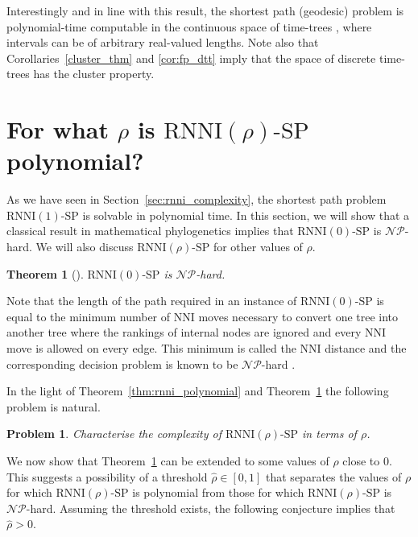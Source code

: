 \documentclass[11pt]{amsart}
\newtheorem{theorem}{Theorem}
\newtheorem{problem}{Problem}
\newcommand{\rnni}{\mathrm{RNNI}}
\newcommand{\nni}{\mathrm{NNI}}
\newcommand{\np}{\mathcal{NP}}
\newcommand{\p}{\mathcal{P}}
\newcommand{\decprob}[1]{\rnni(#1)\text{-}\mathrm{SP}}
\newcommand{\summary}[1]{} %
\begin{document}
Interestingly and in line with this result, the shortest path (geodesic) problem is polynomial-time computable in the continuous space of time-trees \autocite{Gavryushkin2016-uu}, where intervals can be of arbitrary real-valued lengths.
Note also that Corollaries~\ref{cluster_thm} and \ref{cor:fp_dtt} imply that the space of discrete time-trees has the cluster property.


\section{For what $\rho$ is $\decprob{\rho}$ polynomial?}

\summary{Summarising results on complexity of $\decprob{\rho}$ -- $\decprob{1} \in \p$ and $\decprob{0} \in \np$}
As we have seen in Section~\ref{sec:rnni_complexity}, the shortest path problem $\decprob{1}$ is solvable in polynomial time.
In this section, we will show that a classical result in mathematical phylogenetics implies that $\decprob{0}$ is $\np$-hard.
We will also discuss $\decprob{\rho}$ for other values of $\rho$.

\begin{theorem}[\textcite{Dasgupta2000-xa}]
$\decprob{0}$ is $\np$-hard.
\label{thm:nni_hard}
\end{theorem}

\proof
Note that the length of the path required in an instance of $\decprob{0}$ is equal to the minimum number of $\nni$ moves necessary to convert one tree into another tree where the rankings of internal nodes are ignored and every $\nni$ move is allowed on every edge.
This minimum is called the $\nni$ distance and the corresponding decision problem is known to be $\np$-hard \autocite{Dasgupta2000-xa}.
\endproof

\summary{Complexity of $\decprob{\rho}$ changes somewhere between zero and one -- where remains an open question}
In the light of Theorem~\ref{thm:rnni_polynomial} and Theorem~\ref{thm:nni_hard} the following problem is natural.

\begin{problem}
Characterise the complexity of $\decprob{\rho}$ in terms of $\rho$.
\label{prblm:rho_range}
\end{problem}

\summary{Getting one step closer to answer this question by considering small neighbourhoods for $\rho$ around zero and one}
We now show that Theorem~\ref{thm:nni_hard} can be extended to some values of $\rho$ close to $0$.
This suggests a possibility of a threshold $\hat\rho \in [0, 1]$ that separates the values of $\rho$ for which $\decprob{\rho}$ is polynomial from those for which $\decprob{\rho}$ is $\np$-hard.
Assuming the threshold exists, the following conjecture implies that $\hat\rho > 0$.
\end{document}
